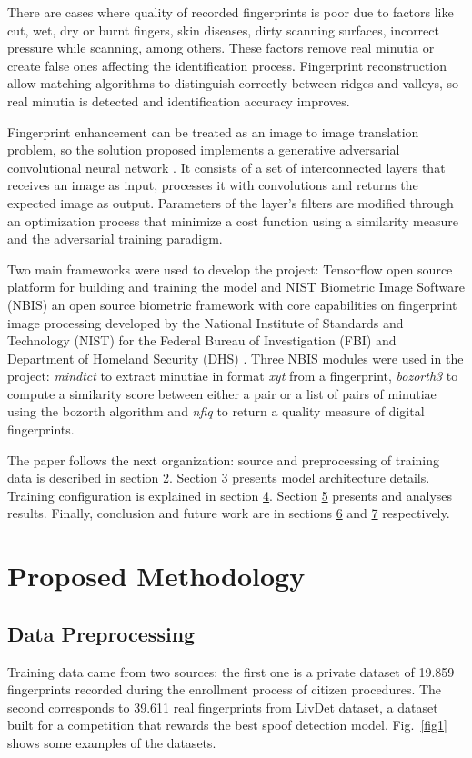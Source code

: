 \documentclass[a4paper,fleqn]{cas-dc}
\begin{document}
There are cases where quality of recorded fingerprints is poor due to factors like cut, wet, dry or burnt fingers, skin diseases, dirty scanning surfaces, incorrect pressure while scanning, among others. These factors remove real minutia or create false ones affecting the identification process. Fingerprint reconstruction allow matching algorithms to distinguish correctly between ridges and valleys, so real minutia is detected and identification accuracy improves.

Fingerprint enhancement can be treated as an image to image translation problem, so the solution proposed implements a generative adversarial convolutional neural network \cite{ITITAN}. It consists of a set of interconnected layers that receives an image as input, processes it with convolutions and returns the expected image as output. Parameters of the layer's filters are modified through an optimization process that minimize a cost function using a similarity measure and the adversarial training paradigm. 

Two main frameworks were used to develop the project: Tensorflow open source platform for building and training the model and NIST Biometric Image Software (NBIS) an open source biometric framework with core capabilities on fingerprint image processing developed by the National Institute of Standards and Technology (NIST) for the Federal Bureau of Investigation (FBI) and Department of Homeland Security (DHS) \cite{NBISWP}. Three NBIS modules were used in the project: \textit{mindtct} to extract minutiae in format \textit{xyt} from a fingerprint, \textit{bozorth3} to compute a similarity score between either a pair or a list of pairs of minutiae using the bozorth algorithm and \textit{nfiq} to return a quality measure of digital fingerprints.

The paper follows the next organization: source and preprocessing of training data is described in section \hyperref[sec:DP]{2}. Section \hyperref[sec:MA]{3} presents model architecture details. Training configuration is explained in section \hyperref[sec:MT]{4}. Section \hyperref[sec:R]{5} presents and analyses results. Finally, conclusion and future work are in sections \hyperref[sec:FW]{6} and \hyperref[sec:FW]{7} respectively.
     
\section{Proposed Methodology}
\label{sec:DP}

\subsection{Data Preprocessing}
Training data came from two sources: the first one is a private dataset of 19.859 fingerprints recorded during the enrollment process of citizen procedures. The second corresponds to 39.611 real fingerprints from LivDet dataset, a dataset built for a competition that rewards the best spoof detection model. Fig.~\ref{fig1} shows some examples of the datasets.
\end{document}
